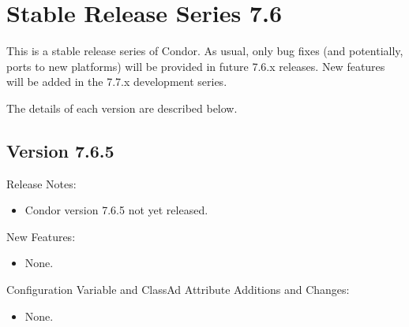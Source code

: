 
\section{\label{sec:History-7-6}Stable Release Series 7.6}

This is a stable release series of Condor.
As usual, only bug fixes (and potentially, ports to new platforms)
will be provided in future 7.6.x releases.
New features will be added in the 7.7.x development series.

The details of each version are described below.

\subsection*{\label{sec:New-7-6-5}Version 7.6.5}

\noindent Release Notes:

\begin{itemize}

\item Condor version 7.6.5 not yet released.

\end{itemize}


\noindent New Features:

\begin{itemize}

\item None.

\end{itemize}

\noindent Configuration Variable and ClassAd Attribute Additions and Changes:

\begin{itemize}

\item None.

\end{itemize}

